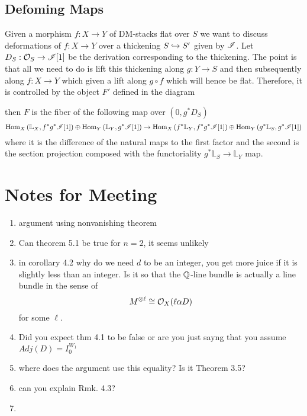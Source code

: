 \documentclass[12pt]{article}
\newcommand{\LL}{\mathbb{L}}
\begin{document}
\subsection{Defoming Maps}

Given a morphism $f : X \to Y$ of DM-stacks flat over $S$ we want to discuss deformations of $f : X \to Y$ over a thickening $S \hookrightarrow S'$ given by $\mathscr{I}$. Let $D_S : \mathcal{O}_{S} \to \mathscr{I}[1]$ be the derivation corresponding to the thickening. The point is that all we need to do is lift this thickening along $g : Y \to S$ and then subsequently along $f : X \to Y$ which given a lift along $g \circ f$ which will hence be flat. Therefore, it is controlled by the object $F'$ defined in the diagram
\begin{center}
\end{center}
then $F$ is the fiber of the following map over $(0, g^* D_S)$
\[ \Hom{X}{\LL_X}{f^* g^* \I[1]} \oplus \Hom{Y}{\LL_Y}{g^* \I[1]} \to \Hom{X}{f^* \LL_Y}{f^* g^* \I[1]} \oplus \Hom{Y}{g^* \LL_S}{g^* \I[1]} \]
where it is the difference of the natural maps to the first factor and the second is the section projection composed with the functoriality $g^* \LL_S \to \LL_Y$ map.


\section{Notes for Meeting}

\begin{enumerate}
\item argument using nonvanishing theorem

\item Can theorem 5.1 be true for $n = 2$, it seems unlikely

\item in corollary 4.2 why do we need $d$ to be an integer, you get more juice if it is slightly less than an integer. Is it so that the $\mathbb{Q}$-line bundle is actually a line bundle in the sense of
\[ M^{\otimes \ell} \cong \mathcal{O}_{X}(\ell \alpha D) \]
for some $\ell$.

\item Did you expect thm 4.1 to be false or are you just sayng that you assume $Adj(D) = I_0^{W_1}$

\item where does the argument use this equality? Is it Theorem 3.5?

\item can you explain Rmk. 4.3?

\item 
\end{enumerate}
\end{document}
